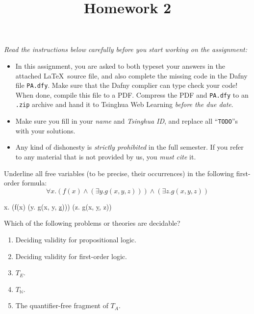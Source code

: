 \documentclass[11pt,a4paper]{article}
\title{Homework 2}
\newcommand{\nat}{\mathbb{N}}
\begin{document}
\maketitle

\textit{Read the instructions below carefully before you start working on the assignment:}
\begin{itemize}
    \item In this assignment, you are asked to both typeset your answers in the attached \LaTeX~source file, and also complete the missing code in the Dafny file \texttt{PA.dfy}.
    Make sure that the Dafny complier can type check your code!
    When done, compile this file to a PDF.
    Compress the PDF and \texttt{PA.dfy} to an \texttt{.zip} archive and hand it to Tsinghua Web Learning \emph{before the due date}.
    \item Make sure you fill in your \emph{name} and \emph{Tsinghua ID},
    and replace all ``\texttt{TODO}''s with your solutions.
    \item Any kind of dishonesty is \emph{strictly prohibited} in the full semester.
    If you refer to any material that is not provided by us, you \emph{must cite} it.
\end{itemize}



\subproblem Underline all free variables (to be precise, their occurrences) in the following first-order formula:
\begin{equation*}
    \forall x. (f(x) \land (\exists y. g(x, y, z))) \land (\exists z. g(x, y, z))
\end{equation*}

\begin{solution}
    \forall x. (f(x) \land (\exists y. g(x, y, \underline{z}))) \land (\exists z. g(x, \underline{y}, z))
\end{solution}

\subproblem Which of the following problems or theories are decidable?

\begin{enumerate}[label=(\alph*)]
    \item Deciding validity for propositional logic.
    \item Deciding validity for first-order logic.
    \item $T_{E}$.
    \item $T_{\nat}$.
    \item The quantifier-free fragment of $T_A$.
\end{enumerate}
\end{document}
